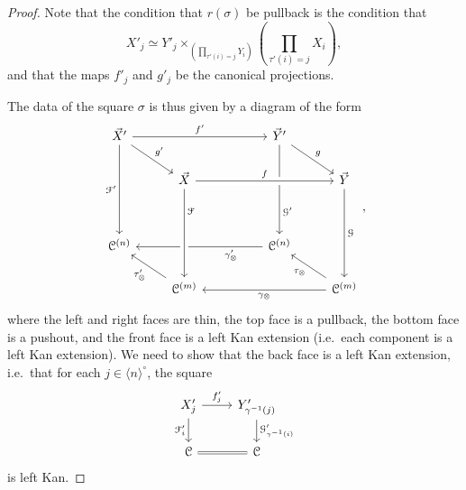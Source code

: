 \documentclass[main.tex]{subfiles}
\begin{document}
\begin{proof}
  Note that the condition that $r(\sigma)$ be pullback is the condition that
  \begin{equation*}
    X'_{j} \simeq Y'_{j} \times_{\left( \prod_{\tau'(i) = j} Y_{i} \right)} \left( \prod_{\tau'(i) = j} X_{i} \right),
  \end{equation*}
  and that the maps $f'_{j}$ and $g'_{j}$ be the canonical projections.

  The data of the square $\sigma$ is thus given by a diagram of the form
  \begin{equation*}
    \begin{tikzcd}
      \vec{X}'
      \arrow[rrr, "f'"]
      \arrow[dr, "g'"]
      \arrow[ddd, swap, "\mathcal{F}'"]
      &&& \vec{Y}'
      \arrow[ddd, near end, "\mathcal{G}'"]
      \arrow[dr, "g"]
      \\
      & \vec{X}
      \arrow[rrr, crossing over, "f"]
      &&& \vec{Y}
      \arrow[ddd, "\mathcal{G}"]
      \\
      \\
      \category{C}^{(n)}
      &&& \category{C}^{(n)}
      \arrow[lll, near start, "\gamma'_{\otimes}"]
      \\
      & \category{C}^{(m)}
      \arrow[ul, "\tau'_{\otimes}"]
      \arrow[from=uuu, crossing over, near start, "\mathcal{F}"]
      &&& \category{C}^{(m)}
      \arrow[lll, "\gamma_{\otimes}"]
      \arrow[ul, "\tau_{\otimes}"]
    \end{tikzcd},
  \end{equation*}
  where the left and right faces are thin, the top face is a pullback, the bottom face is a pushout, and the front face is a left Kan extension (i.e.\ each component is a left Kan extension). We need to show that the back face is a left Kan extension, i.e.\ that for each $j \in \langle n \rangle^{\circ}$, the square
  \begin{equation*}
    \begin{tikzcd}
      X'_{j}
      \arrow[r, "f'_{j}"]
      \arrow[d, swap, "\mathcal{F}'_{i}"]
      & Y'_{\gamma^{-1}(j)}
      \arrow[d, "\mathcal{G}'_{\gamma^{-1}(i)}"]
      \\
      \category{C}
      & \category{C}
      \arrow[l, equals]
    \end{tikzcd}
  \end{equation*}
  is left Kan.


\end{proof}
\end{document}
